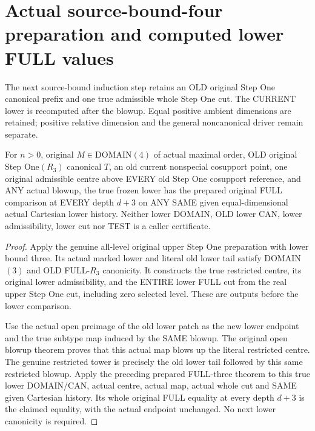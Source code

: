 \section{Actual source-bound-four preparation and computed lower FULL values}

The next source-bound induction step retains an OLD original Step One
canonical prefix and one true admissible whole Step One cut. The
CURRENT lower is recomputed after the blowup. Equal positive ambient
dimensions are retained; positive relative dimension and the general
noncanonical driver remain separate.

\begin{theorem}
\label{hir:original-stepone-bound-four-prepared-lower-etale-values}
\leanok
For $n>0$, original $M\in\mathrm{DOMAIN}(4)$ of actual maximal order,
OLD original Step One$(R_3)$ canonical $T$, an old current nonspecial
cosupport point, one original admissible centre above EVERY old Step
One cosupport reference, and ANY actual blowup, the true frozen lower
has the prepared original FULL comparison at EVERY depth $d+3$ on ANY
SAME given equal-dimensional actual Cartesian lower history. Neither
lower DOMAIN, OLD lower CAN, lower admissibility, lower cut nor TEST
is a caller certificate.
\end{theorem}
\begin{proof}
Apply the genuine all-level original upper Step One preparation with
lower bound three. Its actual marked lower and literal old lower tail
satisfy DOMAIN$(3)$ and OLD FULL-$R_3$ canonicity. It constructs the true
restricted centre, its original lower admissibility, and the ENTIRE
lower FULL cut from the real upper Step One cut, including zero
selected level. These are outputs before the lower comparison.

Use the actual open preimage of the old lower patch as the new lower
endpoint and the true subtype map induced by the SAME blowup. The
original open blowup theorem proves that this actual map blows up the
literal restricted centre. The genuine restricted tower is precisely
the old lower tail followed by this same restricted blowup. Apply the
preceding prepared FULL-three theorem to this true lower DOMAIN/CAN,
actual centre, actual map, actual whole cut and SAME given Cartesian
history. Its whole original FULL equality at every depth $d+3$ is the
claimed equality, with the actual endpoint unchanged. No next lower
canonicity is required.
\end{proof}

